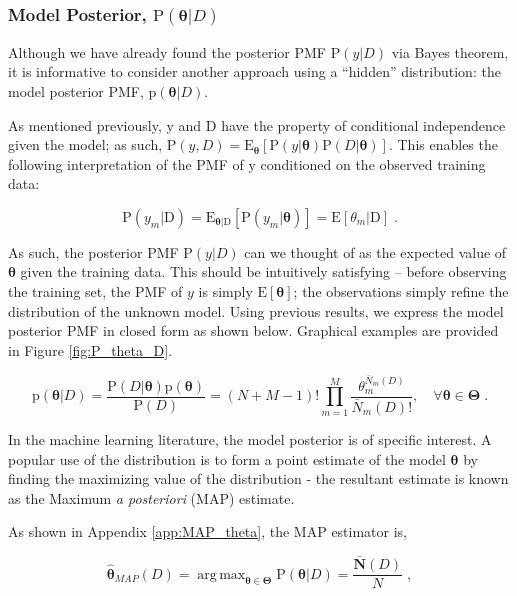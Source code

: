 \documentclass[12pt]{article}
\DeclareMathOperator*{\argmax}{arg\,max}
\begin{document}
\subsubsection{Model Posterior, $\text{P}(\bm{\theta} | D)$}

Although we have already found the posterior PMF $\text{P}(y | D)$ via Bayes theorem, it is informative to consider another approach using a ``hidden'' distribution: the model posterior PMF, $\text{p}(\bm{\theta} | D)$. 

As mentioned previously, $\mathrm{y}$ and $\mathrm{D}$ have the property of conditional independence given the model; as such, $\text{P}(y,D) = \text{E}_{\bm{\theta}} \left[ \text{P}(y | \bm{\theta}) \text{P}(D | \bm{\theta}) \right]$. This enables the following interpretation of the PMF of $\mathrm{y}$ conditioned on the observed training data:

\begin{equation}
\text{P}(y_m | \mathrm{D}) = \text{E}_{\bm{\theta} | \mathrm{D}} \left[ \text{P}(y_m|\bm{\theta}) \right] = \text{E}\left[ \theta_m | \mathrm{D} \right] \;.
\end{equation}

As such, the posterior PMF $\text{P}(y | D)$ can we thought of as the expected value of $\bm{\theta}$ given the training data. This should be intuitively satisfying -- before observing the training set, the PMF of $y$ is simply $\text{E}[\bm{\theta}]$; the observations simply refine the distribution of the unknown model. Using previous results, we express the model posterior PMF in closed form as shown below. Graphical examples are provided in Figure \ref{fig:P_theta_D}.

\begin{equation} \label{P_t_D}
\text{p}(\bm{\theta} | D) = \frac{\text{P}(D | \bm{\theta}) \text{p}(\bm{\theta})}{\text{P}(D)}
= (N+M-1)! \prod_{m=1}^M \frac{\theta_m^{\bar{N}_m(D)}}{\bar{N}_m(D)!} ,  \quad  \forall \bm{\theta} \in \bm{\Theta} \;.
\end{equation}


In the machine learning literature, the model posterior is of specific interest. A popular use of the distribution is to form a point estimate of the model $\bm{\theta}$ by finding the maximizing value of the distribution - the resultant estimate is known as the Maximum \emph{a posteriori} (MAP) estimate. 

As shown in Appendix \ref{app:MAP_theta}, the MAP estimator is,

\begin{equation}
\hat{\bm{\theta}}_{MAP}(D) = \argmax_{\bm{\theta} \in \bm{\Theta}} \text{P}(\bm{\theta} | D) = \frac{\bar{\bm{N}}(D)}{N} \;,
\end{equation}
\end{document}
